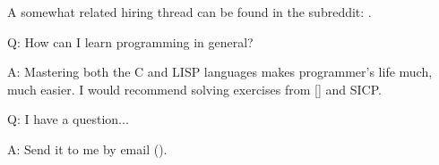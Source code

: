 A somewhat related hiring thread can be found in the  subreddit: \NetsecHiringThread{}.

\par Q: How can I learn programming in general?
\par A: Mastering both the C and LISP languages makes programmer's life much, much easier.
I would recommend solving exercises from [\KRBook] and \ac{SICP}.

\par Q: I have a question...
\par A: Send it to me by email (\EMAIL).




